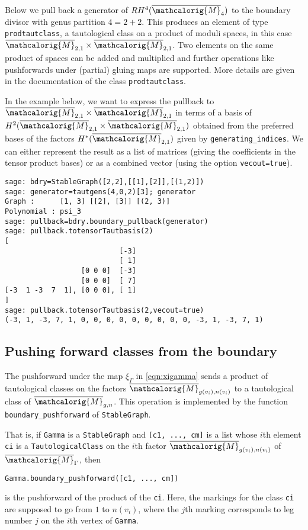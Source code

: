 \documentclass[11pt]{article}
\newcommand{\M}{\ensuremath{\overline{\mathcalorig{M}}}}
\begin{document}
Below we pull back a generator of $RH^4(\M_{4})$ to the boundary divisor with genus partition $4=2+2$. This produces an element of type \verb|prodtautclass|, a tautological class on a product of moduli spaces, in this case $\M_{2,1} \times \M_{2,1}$. Two elements on the same product of spaces can be added and multiplied and further operations like pushforwards under (partial) gluing maps are supported. More details are given in the documentation of the class \texttt{prodtautclass}.

In the example below, we want to express the pullback to $\M_{2,1} \times \M_{2,1}$ in terms of a basis of $H^2(\M_{2,1} \times \M_{2,1})$ obtained from the preferred bases of the factors $H^*(\M_{2,1})$ given by \verb|generating_indices|. We can either represent the result as a list of matrices (giving the coefficients in the tensor product bases) or as a combined vector (using the option \verb|vecout=true|).

\begin{lstlisting}
sage: bdry=StableGraph([2,2],[[1],[2]],[(1,2)])
sage: generator=tautgens(4,0,2)[3]; generator
Graph :      [1, 3] [[2], [3]] [(2, 3)]
Polynomial : psi_3
sage: pullback=bdry.boundary_pullback(generator)
sage: pullback.totensorTautbasis(2)
[
                           [-3]
                           [ 1]
                  [0 0 0]  [-3]
                  [0 0 0]  [ 7]
[-3  1 -3  7  1], [0 0 0], [ 1]
]
sage: pullback.totensorTautbasis(2,vecout=true)
(-3, 1, -3, 7, 1, 0, 0, 0, 0, 0, 0, 0, 0, 0, -3, 1, -3, 7, 1)
\end{lstlisting}
%
%

\subsection{Pushing forward classes from the boundary} \label{Sect:bdrypushforward}
The pushforward under the map $\xi_\Gamma$ in \eqref{eqn:xigamma} sends a product of tautological classes on the factors $\M_{g(v_i),n(v_i)}$ to a tautological class of $\M_{g,n}$. This operation is implemented by the function \verb|boundary_pushforward| of \texttt{StableGraph}.

That is, if \texttt{Gamma} is a \texttt{StableGraph} and \texttt{[c1, ..., cm]} is a list whose $i$th element \texttt{ci} is a \texttt{TautologicalClass} on the $i$th factor $\M_{g(v_i),n(v_i)}$ of $\M_\Gamma$, then
\begin{center} \verb|Gamma.boundary_pushforward([c1, ..., cm])| \end{center} is the pushforward of the product of the \texttt{ci}. Here, the markings for the class \texttt{ci} are supposed to go from $1$ to $n(v_i)$, where the $j$th marking corresponds to leg number $j$ on the $i$th vertex of \texttt{Gamma}.
\end{document}
